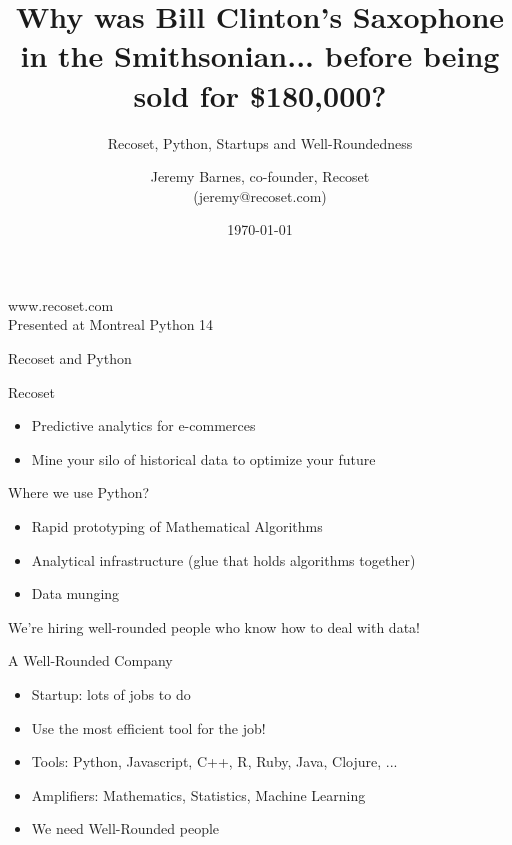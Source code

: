 \documentclass{beamer}
\title{Why was Bill Clinton's Saxophone in the Smithsonian... before being sold for \$180,000?}
\subtitle{Recoset, Python, Startups and Well-Roundedness}
\author{Jeremy Barnes, co-founder, Recoset \\ (jeremy@recoset.com)}
\date{\today}
\begin{document}
\begin{frame}
  \titlepage
  \begin{center}
    www.recoset.com \\
    Presented at Montreal Python 14
  \end{center}
\end{frame}

\begin{frame}{Recoset and Python}

Recoset
\begin{itemize}
  \item Predictive analytics for e-commerces
  \item Mine your silo of historical data to optimize your future
\end{itemize}

Where we use Python?
\begin{itemize}
  \item Rapid prototyping of Mathematical Algorithms
  \item Analytical infrastructure (glue that holds algorithms together)
  \item Data munging
\end{itemize}

We're hiring well-rounded people who know how to deal with data!

\end{frame}

\begin{frame}{A Well-Rounded Company}

\begin{itemize}
  \item Startup: lots of jobs to do
  \item Use the most efficient tool for the job!
  \item Tools: Python, Javascript, C++, R, Ruby, Java, Clojure, ...
  \item Amplifiers: Mathematics, Statistics, Machine Learning
  \item We need Well-Rounded people
\end{itemize}

\end{frame}
\end{document}
